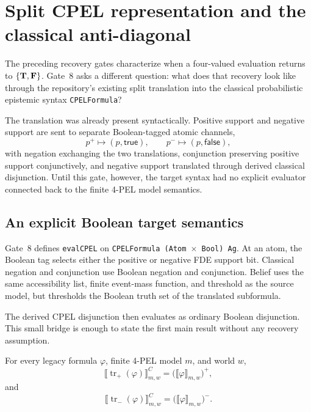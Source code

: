 \section{Split CPEL representation and the classical anti-diagonal}
\label{sec:cpel-classical-collapse}

The preceding recovery gates characterize when a four-valued evaluation returns to
\(\{\mathbf{T},\mathbf{F}\}\).  Gate~8 asks a different question: what does that recovery look
like through the repository's existing split translation into the classical
probabilistic epistemic syntax \texttt{CPELFormula}?

The translation was already present syntactically.  Positive support and negative
support are sent to separate Boolean-tagged atomic channels,
\[
  p^+ \mapsto (p,\mathsf{true}),
  \qquad
  p^- \mapsto (p,\mathsf{false}),
\]
with negation exchanging the two translations, conjunction preserving positive
support conjunctively, and negative support translated through derived classical
disjunction.  Until this gate, however, the target syntax had no explicit evaluator
connected back to the finite 4-PEL model semantics.

\subsection{An explicit Boolean target semantics}

Gate~8 defines \texttt{evalCPEL} on \texttt{CPELFormula (Atom $\times$ Bool) Ag}.
At an atom, the Boolean tag selects either the positive or negative FDE support bit.
Classical negation and conjunction use Boolean negation and conjunction.  Belief uses
the same accessibility list, finite event-mass function, and threshold as the source
model, but thresholds the Boolean truth set of the translated subformula.

The derived CPEL disjunction then evaluates as ordinary Boolean disjunction.  This
small bridge is enough to state the first main result without any recovery assumption.

\begin{theorem}
\label{thm:cpel-split-bits}
For every legacy formula \(\varphi\), finite 4-PEL model \(m\), and world \(w\),
\[
  \llbracket \operatorname{tr}_{+}(\varphi)\rrbracket^{C}_{m,w}
    = \bigl(\llbracket\varphi\rrbracket_{m,w}\bigr)^{+},
\]
and
\[
  \llbracket \operatorname{tr}_{-}(\varphi)\rrbracket^{C}_{m,w}
    = \bigl(\llbracket\varphi\rrbracket_{m,w}\bigr)^{-}.
\]
\statusverified
\end{theorem}

